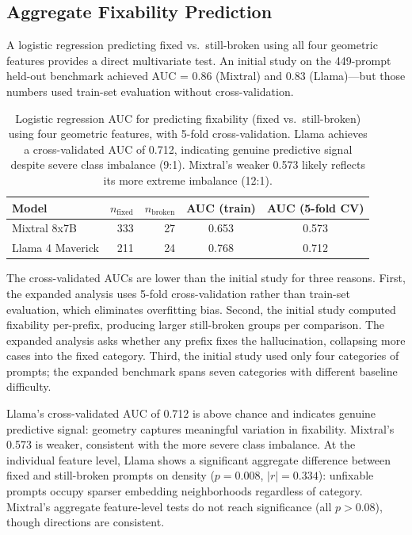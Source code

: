 \subsection{Aggregate Fixability Prediction}
\label{sec:aggregate-fixability}

A logistic regression predicting fixed vs.\ still-broken using all four geometric features provides a direct multivariate test. An initial study on the 449-prompt held-out benchmark achieved AUC = 0.86 (Mixtral) and 0.83 (Llama)---but those numbers used train-set evaluation without cross-validation.

\begin{table}[ht]
\centering
\small
\begin{tabular}{@{}lrrcc@{}}
\toprule
\textbf{Model} & $n_{\text{fixed}}$ & $n_{\text{broken}}$ & \textbf{AUC (train)} & \textbf{AUC (5-fold CV)} \\
\midrule
Mixtral 8x7B & 333 & 27 & 0.653 & 0.573 \\
Llama 4 Maverick & 211 & 24 & 0.768 & 0.712 \\
\bottomrule
\end{tabular}
\caption{Logistic regression AUC for predicting fixability (fixed vs.\ still-broken) using four geometric features, with 5-fold cross-validation. Llama achieves a cross-validated AUC of 0.712, indicating genuine predictive signal despite severe class imbalance (9:1). Mixtral's weaker 0.573 likely reflects its more extreme imbalance (12:1).}
\label{tab:fixability-auc}
\end{table}

The cross-validated AUCs are lower than the initial study for three reasons. First, the expanded analysis uses 5-fold cross-validation rather than train-set evaluation, which eliminates overfitting bias. Second, the initial study computed fixability per-prefix, producing larger still-broken groups per comparison. The expanded analysis asks whether any prefix fixes the hallucination, collapsing more cases into the fixed category. Third, the initial study used only four categories of prompts; the expanded benchmark spans seven categories with different baseline difficulty.

Llama's cross-validated AUC of 0.712 is above chance and indicates genuine predictive signal: geometry captures meaningful variation in fixability. Mixtral's 0.573 is weaker, consistent with the more severe class imbalance. At the individual feature level, Llama shows a significant aggregate difference between fixed and still-broken prompts on density ($p = 0.008$, $|r| = 0.334$): unfixable prompts occupy sparser embedding neighborhoods regardless of category. Mixtral's aggregate feature-level tests do not reach significance (all $p > 0.08$), though directions are consistent.


